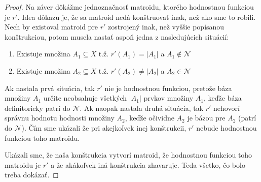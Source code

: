 \begin{proof}
	\medskip
	Na záver dôkážme jednoznačnosť matroidu, ktorého hodnostnou funkciou je $r'$. Idea dôkazu je, že sa matroid nedá konštruovať inak, než ako sme to robili.
	Nech by existoval matroid pre $r'$ zostrojený inak, než vyššie popísanou konštrukciou, potom musela nastať aspoň jedna z nasledujúcich situácií:
	\begin{enumerate}
	\itemsep0em
	\item	Existuje množina $A_1 \subseteq X$ t.ž.	$r'(A_1)=|A_1|$ a $A_1 \notin \mathcal{N}$
	\item	Existuje množina $A_2 \subseteq X$ t.ž.	$r'(A_2)\ne|A_2|$ a $A_2 \in \mathcal{N}$
	\end{enumerate}
	Ak nastala prvá situácia, tak $r'$ nie je hodnostnou funkciou, pretože báza množiny $A_1$ určite neobsahuje všetkých $|A_1|$ prvkov množiny $A_1$, keďže báza definitoricky patrí do $\mathcal{N}$.	Ak naopak nastala druhá situácia, tak $r'$ nehovorí správnu hodnotu hodnosti množiny $A_2$, keďže očividne $A_2$ je bázou pre $A_2$	(patrí do $\mathcal{N}$). Čím sme ukázali že pri akejkoľvek inej konštrukcii, $r'$ nebude hodnostnou funkciou toho matroidu.

	\medskip
	Ukázali sme, že naša konštrukcia vytvorí matroid, že hodnostnou funkciou toho matroidu je $r'$ a že akákoľvek iná konštrukcia zhavaruje. Teda všetko, čo bolo treba dokázať.
\end{proof}

